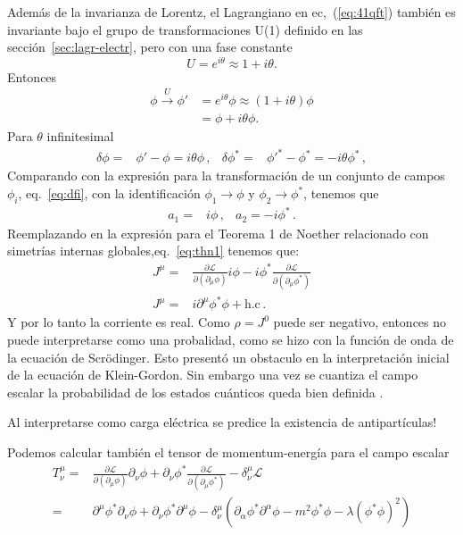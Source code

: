 Además de la invarianza de Lorentz, el Lagrangiano en ec,~(\ref{eq:41qft}) también es invariante bajo el grupo de transformaciones U(1) definido en las sección~\ref{sec:lagr-electr}, pero con una fase constante
\begin{equation*}
  U=e^{i\theta}\approx1+i\theta.
\end{equation*}
Entonces
\begin{align}
  \phi\overset{U}{\longrightarrow}\phi'&=e^{i\theta}\phi\approx(1+i\theta)\phi\nonumber\\
  &=\phi+i\theta\phi.
\end{align}
Para $\theta$ infinitesimal
\begin{align}
\label{eq:deltaphi}
  \delta\phi=&\phi'-\phi=i\theta\phi\,,&  \delta\phi^*=&{\phi'}^*-\phi^*=-i\theta\phi^*\,,
\end{align}
Comparando con la expresión para la transformación de un conjunto de campos $\phi_i$, eq.~\eqref{eq:dfi}, con la identificación $\phi_1\to \phi$ y $\phi_2\to \phi^{*}$, tenemos que
\begin{align}
  a_1=& i\phi\,, & a_2 =-i\phi^{*}\,.
\end{align}
Reemplazando en la expresión para el Teorema 1 de Noether relacionado con simetrías internas globales,eq.~\eqref{eq:thn1} tenemos que:
\begin{align}
  J^\mu=&\frac{\partial\mathcal{L}}{\partial(\partial_\mu\phi)}i\phi-i \phi^{*}\frac{\partial\mathcal{L}}{\partial(\partial_\mu\phi^*)}\nonumber\\
  \label{eq:45qft}
  J^\mu=&i\partial^\mu\phi^*\phi+\text{h.c}\,.
\end{align}
Y por lo tanto la corriente es real.
Como $\rho=J^{0}$ puede ser negativo, entonces no puede interpretarse como una
probalidad, como se hizo con la función de onda de la ecuación de
Scrödinger. Esto presentó un obstaculo en la interpretación inicial de
la ecuación de Klein-Gordon. Sin embargo una vez se cuantiza el
campo escalar la probabilidad de los estados cuánticos queda bien
definida \cite{Gross}.

Al interpretarse como carga eléctrica se predice la existencia de antipartículas!

Podemos calcular también el tensor de momentum-energía para el campo escalar
\begin{align}
  T^\mu_\nu=&\frac{\partial\mathcal{L}}{\partial\left(\partial_\mu\phi\right)} \partial_\nu \phi + \partial_\nu \phi^* \frac{\partial\mathcal{L}}{\partial\left(\partial_\mu\phi^*\right)}-\delta_\nu^\mu \mathcal{L} \nonumber\\
   =&\partial^\mu\phi^* \partial_\nu \phi + \partial_\nu \phi^* \partial^\mu\phi-\delta_\nu^\mu \left(\partial_{\alpha}\phi^{*} \partial^{\alpha}\phi-m^2\phi^{*}\phi-\lambda \left(\phi^{*}\phi \right)^2\right)\nonumber\\
\end{align}


